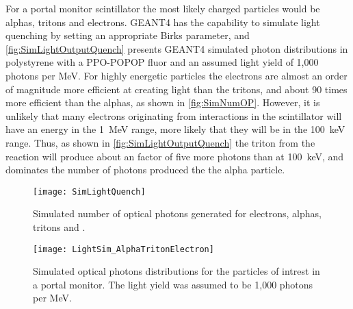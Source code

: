 For a portal monitor scintillator the most likely charged particles would be alphas, tritons and electrons.
GEANT4 has the capability to simulate light quenching by setting an appropriate Birks parameter, and \autoref{fig:SimLightOutputQuench} presents GEANT4 simulated photon distributions in polystyrene with a PPO-POPOP fluor and an assumed light yield of 1,000 photons per MeV.
For highly energetic particles the electrons are almost an order of magnitude more efficient at creating light than the tritons, and about 90 times more efficient than the alphas, as shown in \autoref{fig:SimNumOP}.
However, it is unlikely that many electrons originating from  interactions in the scintillator will have an energy in the \SI{1}{\MeV} range, more likely that they will be in the \SI{100}{\keV} range.
Thus, as shown in \autoref{fig:SimLightOutputQuench} the triton from the  reaction will produce about an factor of five more photons than at \SI{100}{\keV}, and dominates the number of photons produced the the alpha particle.
\begin{figure}
  \centering
    \texttt{[image: SimLightQuench]}
    \caption[Simulated Number of Optical Photons for Various Ions and Energies]{Simulated number of optical photons generated for electrons, alphas, tritons and .}
	\label{fig:SimNumOP}
  \end{figure}
  \begin{figure}
	\centering
    \texttt{[image: LightSim\_AlphaTritonElectron]}
  \caption[GEANT4 simulated light output of alpha, tritons and electrons in polystryene]{Simulated optical photons distributions for the particles of intrest in a portal monitor. The light yield was assumed to be 1,000 photons per MeV.}
  \label{fig:SimLightOutputQuench}
\end{figure}

